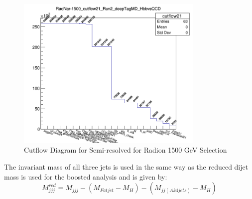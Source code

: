 \begin{figure}[!htb]
	\centering
    \includegraphics[width=0.8\textwidth]{Figures/radnar1500_cutflow21_Run2_deepTagMD_HbbvsQCD.png}
	\caption{Cutflow Diagram for Semi-resolved for Radion 1500 GeV Selection}
	\label{fig:21Cutflowsig}
\end{figure}

The invariant mass of all three jets is used in the same way as the reduced dijet mass is used for the boosted analysis and is given by:
\begin{equation}
M^{red}_{jjj} = M_{jjj} - (M_{Fatjet} - M_H) - (M_{jj(Ak4jets)} - M_H) \label{eq:mred2p1}
\end{equation} 